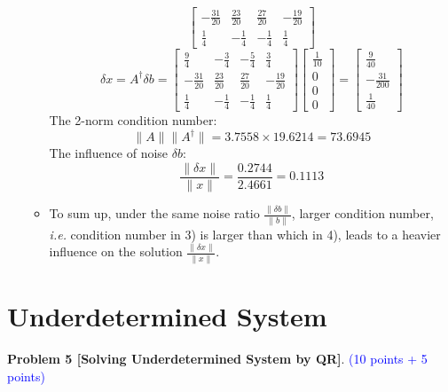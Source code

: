 \documentclass[english,onecolumn]{IEEEtran}
\begin{document}
\begin{enumerate}
\begin{itemize}
$$\begin{bmatrix}
    		-\frac{31}{20} & \frac{23}{20} &\frac{27}{20} & -\frac{19}{20}\\
    		\frac{1}{4} & -\frac{1}{4} & -\frac{1}{4} & \frac{1}{4}
    	\end{bmatrix}$$
    	$$\delta x = A^{\dagger}\delta b = \begin{bmatrix}
    		\frac{9}{4} & -\frac{3}{4} & -\frac{5}{4} & \frac{3}{4}\\
    		-\frac{31}{20} & \frac{23}{20} &\frac{27}{20} & -\frac{19}{20}\\
    		\frac{1}{4} & -\frac{1}{4} & -\frac{1}{4} & \frac{1}{4}
    	\end{bmatrix}\begin{bmatrix} \frac{1}{10} \\ 0\\ 0\\ 0 \end{bmatrix}=\begin{bmatrix} \frac{9}{40} \\ -\frac{31}{200}\\ \frac{1}{40}\end{bmatrix}$$
    	The 2-norm condition number:
    	$$\|A\|\|A^{\dagger}\| = 3.7558 \times 19.6214= 73.6945$$
    	The influence of noise $\delta b$:
    	$$\frac{\|\delta x\|}{\|x\|} = \frac{0.2744}{2.4661}=0.1113$$
    	\item To sum up, under the same noise ratio $\frac{\|\delta b\|}{\|b\|}$, larger condition number, \textit{i.e.} condition number in 3) is larger than which in 4), leads to a heavier influence on the solution $\frac{\|\delta x\|}{\|x\|}$.
    \end{itemize}
\end{enumerate}


\newpage
\section{Underdetermined System}

\noindent\textbf{Problem 5 [Solving Underdetermined System by QR]}. \textcolor{blue}{(10 points + 5 points)}
\end{document}
